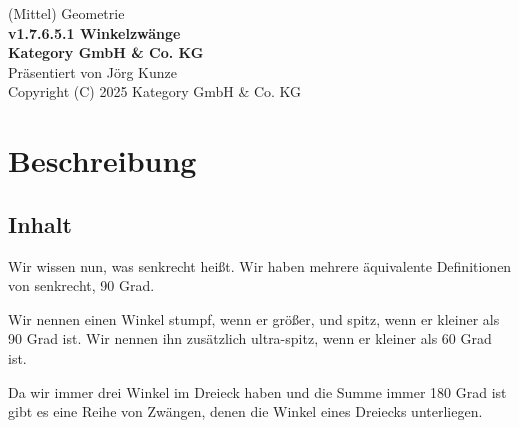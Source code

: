 \documentclass[a4paper]{amsart}
\theoremstyle{definition}
\begin{document}
\begin{titlepage}
\centering
{\huge
(Mittel) Geometrie\\[1cm]
\textbf{v1.7.6.5.1 Winkelzwänge}
}\\[1cm]

\textbf{Kategory GmbH \& Co. KG}\\
Präsentiert von Jörg Kunze\\
Copyright (C) 2025 Kategory GmbH \& Co. KG

\end{titlepage}

%

\newpage

\section*{Beschreibung}


\subsection*{Inhalt}
Wir wissen nun, was senkrecht heißt. Wir haben mehrere äquivalente Definitionen von senkrecht, 90 Grad.

Wir nennen einen Winkel stumpf, wenn er größer, und spitz, wenn er kleiner als 90 Grad ist. Wir nennen ihn zusätzlich ultra-spitz, wenn er kleiner als 60 Grad ist.

Da wir immer drei Winkel im Dreieck haben und die Summe immer 180 Grad ist gibt es eine Reihe von Zwängen, denen die Winkel eines Dreiecks unterliegen.
\end{document}
